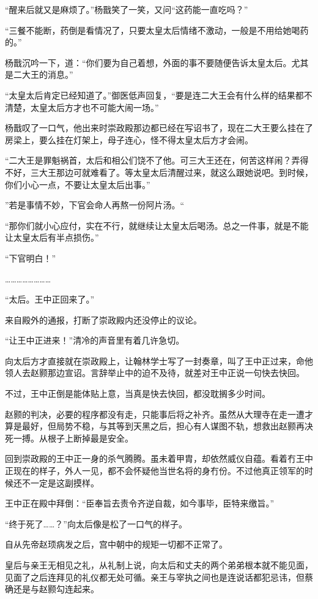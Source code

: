“醒来后就又是麻烦了。”杨戬笑了一笑，又问“这药能一直吃吗？”

“三餐不能断，药倒是看情况了，只要太皇太后情绪不激动，一般是不用给她喝药的。”

杨戬沉吟一下，道：“你们要为自己着想，外面的事不要随便告诉太皇太后。尤其是二大王的消息。”

“太皇太后肯定已经知道了。”御医低声回复，“要是连二大王会有什么样的结果都不清楚，太皇太后方才也不可能大闹一场。”

杨戬叹了一口气，他出来时崇政殿那边都已经在写诏书了，现在二大王要么挂在了房梁上，要么挂在灯架上，母子连心，怪不得太皇太后方才会闹。

“二大王是罪魁祸首，太后和相公们饶不了他。可三大王还在，何苦这样闹？弄得不好，三大王那边可就难看了。等太皇太后清醒过来，就这么跟她说吧。到时候，你们小心一点，不要让太皇太后出事。”

”若是事情不妙，下官会命人再熬一份阿片汤。“

“那你们就小心应付，实在不行，就继续让太皇太后喝汤。总之一件事，就是不能让太皇太后有半点损伤。”

“下官明白！”

……………………

“太后。王中正回来了。”

来自殿外的通报，打断了崇政殿内还没停止的议论。

“让王中正进来！”清冷的声音里有着几许急切。

向太后方才直接就在崇政殿上，让翰林学士写了一封奏章，叫了王中正过来，命他领人去赵颢那边宣诏。言辞举止中的迫不及待，就差对王中正说一句快去快回。

不过，王中正倒是能体贴上意，当真是快去快回，都没耽搁多少时间。

赵颢的判决，必要的程序都没有走，只能事后将之补齐。虽然从大理寺在走一遭才算是最好，但局势不稳，与其等到天黑之后，担心有人谋图不轨，想救出赵颢再决死一搏。从根子上断掉最是安全。

回到崇政殿的王中正一身的杀气腾腾。虽未着甲胄，却依然威仪自蕴。看着冇王中正现在的样子，外人一见，都不会怀疑他当世名将的身冇份。不过他真正领军的时候还不一定是这副摸样。

王中正在殿中拜倒：“臣奉旨去责令齐逆自裁，如今事毕，臣特来缴旨。”

“终于死了……？”向太后像是松了一口气的样子。

自从先帝赵顼病发之后，宫中朝中的规矩一切都不正常了。

皇后与亲王无相见之礼，从礼制上说，向太后和丈夫的两个弟弟根本就不能见面，见面了之后连拜见的礼仪都无处可循。亲王与宰执之间也是连说话都犯忌讳，但蔡确还是与赵颢勾连起来。

